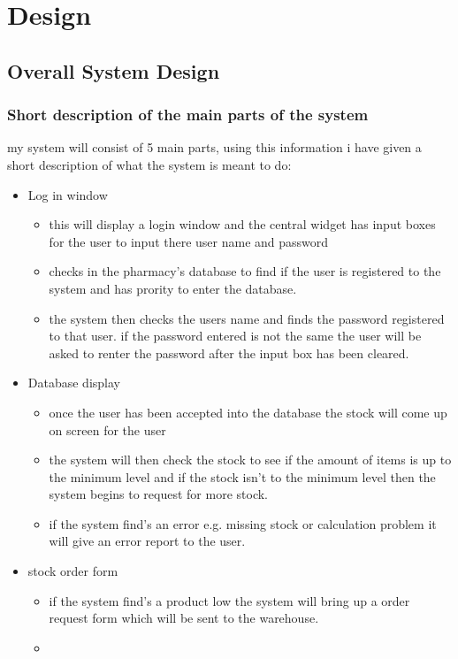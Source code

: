 \chapter{Design}

\section{Overall System Design}

\subsection{Short description of the main parts of the system}
my system will consist of 5 main parts, using this information i have given a short description of what the system is meant to do:
\begin{itemize}
\item Log in window 
\begin{itemize}
\item this will display a login window and the central widget has input boxes for the user to input there user name and password
\item checks in the pharmacy's database to find if the user is registered to the system and has prority to enter the database.
\item the system then checks the users name and finds the password registered to that user. if the password entered is not the same the user will be asked to renter the password after the input box has been cleared.
\end{itemize}
\item Database display
\begin{itemize}
\item once the user has been accepted into the database the stock will come up on screen for the user 
\item the system will then check the stock to see if the amount of items is up to the minimum level and if the stock isn't to the minimum level then the system begins to request for more stock.
\item if the system find's an error e.g. missing stock or calculation problem it will give an error report to the user.
\end{itemize}
\item stock order form
\begin{itemize}
\item if the system find's a product low the system will bring up a order request form which will be sent to the warehouse.
\item
\end{itemize}
\end{itemize}
